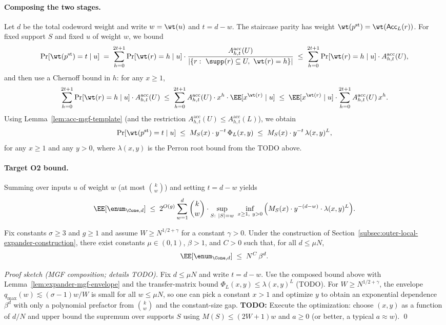\paragraph{Composing the two stages.}
Let $d$ be the total codeword weight and write $w=\wt(u)$ and $t=d-w$.
The staircase parity has weight $\wt(p^{\mathrm{st}})=\wt({\sf Acc}_L(r))$.
For fixed support $S$ and fixed $u$ of weight $w$, we bound
\[
\Pr[\wt(p^{\mathrm{st}})=t\mid u]
\;=\;
\sum_{h=0}^{2t+1}\Pr[\wt(r)=h\mid u]\cdot \frac{A^{\mathrm{acc}}_{h,t}(U)}{|\{r:\ \supp(r)\subseteq U,\ \wt(r)=h\}|}
\;\le\;
\sum_{h=0}^{2t+1}\Pr[\wt(r)=h\mid u]\cdot A^{\mathrm{acc}}_{h,t}(U),
\]
and then use a Chernoff bound in $h$:
for any $x\ge 1$,
\[
\sum_{h=0}^{2t+1}\Pr[\wt(r)=h\mid u]\cdot A^{\mathrm{acc}}_{h,t}(U)
\;\le\;
\sum_{h=0}^{2t+1} A^{\mathrm{acc}}_{h,t}(U)\cdot x^{h}\cdot \EE[x^{\wt(r)}\mid u]
\;\le\;
\EE[x^{\wt(r)}\mid u]\cdot \sum_{h=0}^{2t+1} A^{\mathrm{acc}}_{h,t}(U)\,x^{h}.
\]
Using Lemma~\ref{lem:acc-mgf-template} (and the restriction $A^{\mathrm{acc}}_{h,t}(U)\le A^{\mathrm{acc}}_{h,t}(L)$),
we obtain
\[
\Pr[\wt(p^{\mathrm{st}})=t\mid u]
\;\le\;
M_S(x)\cdot y^{-t}\,\Phi_L(x,y)
\;\le\;
M_S(x)\cdot y^{-t}\,\lambda(x,y)^{L},
\]
for any $x\ge 1$ and any $y>0$, where $\lambda(x,y)$ is the Perron root bound from the TODO above.

\paragraph{Target O2 bound.}
Summing over inputs $u$ of weight $w$ (at most $\binom{k}{w}$) and setting $t=d-w$ yields
\[
\EE[\enum_{\Cone,d}]
\;\le\;
2^{O(g)}\sum_{w=1}^{d} \binom{k}{w}\cdot
\sup_{S:\ |S|=w}\ \inf_{x\ge 1,\ y>0}
\Big(M_S(x)\cdot y^{-(d-w)}\cdot \lambda(x,y)^{L}\Big).
\]

\begin{theorem}
\label{thm:outer-local-expander-spectrum-template}
Fix constants $\sigma\ge 3$ and $g\ge 1$ and assume $W\ge N^{1/2+\gamma}$ for a constant $\gamma>0$.
Under the construction of Section~\ref{subsec:outer-local-expander-construction}, there exist constants
$\mu\in(0,1)$, $\beta>1$, and $C>0$ such that, for all $d\le \mu N$,
\[
\EE[\enum_{\Cone,d}] \;\le\; N^{C}\,\beta^{d}.
\]
\end{theorem}

\begin{proof}[Proof sketch (MGF composition; details TODO)]
Fix $d\le \mu N$ and write $t=d-w$.
Use the composed bound above with Lemma~\ref{lem:expander-mgf-envelope} and the transfer-matrix bound
$\Phi_L(x,y)\le \lambda(x,y)^L$ (TODO).
For $W\ge N^{1/2+\gamma}$, the envelope $q_{\max}(w)\lesssim (\sigma-1)w/W$ is small for all $w\le \mu N$, so one can pick
a constant $x>1$ and optimize $y$ to obtain an exponential dependence $\beta^{d}$ with only a polynomial prefactor from
$\binom{k}{w}$ and the constant-size gap.
\noindent\textbf{TODO:} Execute the optimization: choose $(x,y)$ as a function of $d/N$ and upper bound the supremum over
supports $S$ using $M(S)\le (2W+1)w$ and $a\ge 0$ (or better, a typical $a\approx w$).
\qed
\end{proof}

